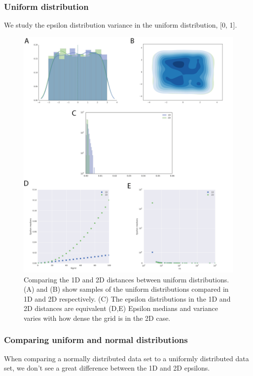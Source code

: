 \clearpage
 \subsubsection{Uniform distribution}

We study the epsilon distribution variance in the uniform distribution, [0, 1].  

\begin{figure}[htbp]
\centering
\includegraphics[scale=0.6]{chapterABCFlow/images/epsilon_uniform.png}
\caption[LoF caption]{Comparing the 1D and 2D distances between uniform distributions. (A) and (B) show samples of the uniform distributions compared in 1D and 2D respectively. (C) The epsilon distributions in the 1D and 2D distances are equivalent (D,E) Epsilon medians and variance varies with how dense the grid is in the 2D case.}
\label{fig:epsilon_uniform}
\end{figure}


 \subsubsection{Comparing uniform and normal distributions}
When comparing a normally distributed data set to a uniformly distributed data set, we don't see a great difference between the 1D and 2D epsilons.


